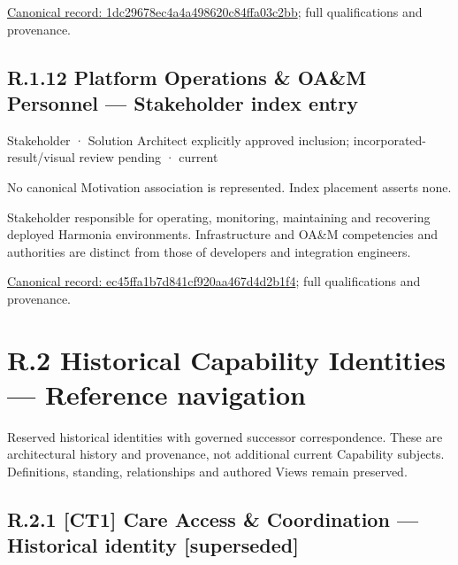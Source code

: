 {\footnotesize \href{../../../../../../../continuum/motivation/stakeholder/1dc29678ec4a4a498620c84ffa03c2bb.md}{Canonical record: 1dc29678ec4a4a498620c84ffa03c2bb}; full qualifications and provenance.}\par
\section*{R.1.12 Platform Operations \& OA\&M Personnel — Stakeholder index entry}
\label{navigation:R.1.12}

\label{element:ec45ffa1b7d841cf920aa467d4d2b1f4}
{\small Stakeholder · Solution Architect explicitly approved inclusion; incorporated-result/visual review pending · current}\par
No canonical Motivation association is represented. Index placement asserts none.\par

Stakeholder responsible for operating, monitoring, maintaining and recovering deployed Harmonia environments. Infrastructure and OA\&M competencies and authorities are distinct from those of developers and integration engineers.


{\footnotesize \href{../../../../../../../continuum/motivation/stakeholder/ec45ffa1b7d841cf920aa467d4d2b1f4.md}{Canonical record: ec45ffa1b7d841cf920aa467d4d2b1f4}; full qualifications and provenance.}\par
\chapter*{R.2 Historical Capability Identities — Reference navigation}
\label{navigation:R.2}

Reserved historical identities with governed successor correspondence. These are architectural history and provenance, not additional current Capability subjects. Definitions, standing, relationships and authored Views remain preserved.\par
\section*{R.2.1 [CT1] Care Access \& Coordination — Historical identity [superseded]}
\label{navigation:R.2.1}

